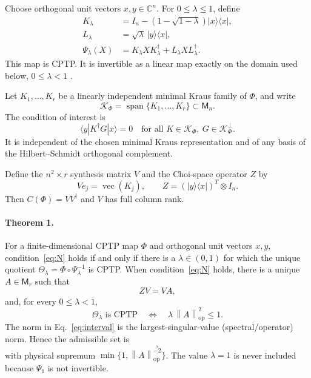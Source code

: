 \documentclass[aip,jmp,preprint]{revtex4-2}
\newcommand{\M}{\mathsf{M}}
\newcommand{\K}{\mathcal{K}}
\newcommand{\opnorm}[1]{\left\lVert #1\right\rVert_{\mathrm{op}}}
\begin{document}
Choose orthogonal unit vectors $x,y\in\mathbb C^n$.  For $0\leq\lambda\leq1$, define
\begin{align}
 K_\lambda&=I_n-(1-\sqrt{1-\lambda})|x\rangle\langle x|,\nonumber\\
 L_\lambda&=\sqrt\lambda\,|y\rangle\langle x|,\label{eq:elementary-kraus}\\
 \Psi_\lambda(X)&=K_\lambda X K_\lambda^\dagger+L_\lambda X L_\lambda^\dagger .
\end{align}
This map is CPTP.  It is invertible as a linear map exactly on the domain used below, $0\leq\lambda<1$ \cite{vomEnde2025}.

Let $K_1,\ldots,K_r$ be a linearly independent minimal Kraus family of $\Phi$, and write
\begin{equation}
 \K_\Phi=\operatorname{span}\{K_1,\ldots,K_r\}\subset\M_n.
\end{equation}
The condition of interest is
\begin{equation}
 \langle y|K^\dagger G|x\rangle=0
 \quad\text{for all }K\in\K_\Phi,
 \ G\in\K_\Phi^\perp . \tag{N}\label{eq:N}
\end{equation}
It is independent of the chosen minimal Kraus representation and of any basis of the Hilbert--Schmidt orthogonal complement.

Define the $n^2\times r$ synthesis matrix $V$ and the Choi-space operator $Z$ by
\begin{equation}
 Ve_j=\operatorname{vec}(K_j),\qquad
 Z=(|y\rangle\langle x|)^T\otimes I_n . \label{eq:VZ}
\end{equation}
Then $C(\Phi)=VV^\dagger$ and $V$ has full column rank.

\paragraph*{Theorem 1.}
For a finite-dimensional CPTP map $\Phi$ and orthogonal unit vectors $x,y$, condition~\eqref{eq:N} holds if and only if there is a $\lambda\in(0,1)$ for which the unique quotient $\Theta_\lambda=\Phi\circ\Psi_\lambda^{-1}$ is CPTP.  When condition~\eqref{eq:N} holds, there is a unique $A\in\M_r$ such that
\begin{equation}
 ZV=VA, \label{eq:Adef}
\end{equation}
and, for every $0\leq\lambda<1$,
\begin{equation}
 \Theta_\lambda\text{ is CPTP}
 \quad\Longleftrightarrow\quad
 \lambda\,\opnorm{A}^{2}\leq1 . \label{eq:interval}
\end{equation}
The norm in Eq.~\eqref{eq:interval} is the largest-singular-value (spectral/operator) norm.  Hence the admissible set is
\begin{equation}
 [0,1)\cap[0,\opnorm{A}^{-2}], \label{eq:physical-interval}
\end{equation}
with physical supremum $\min\{1,\opnorm{A}^{-2}\}$.  The value $\lambda=1$ is never included because $\Psi_1$ is not invertible.
\end{document}
